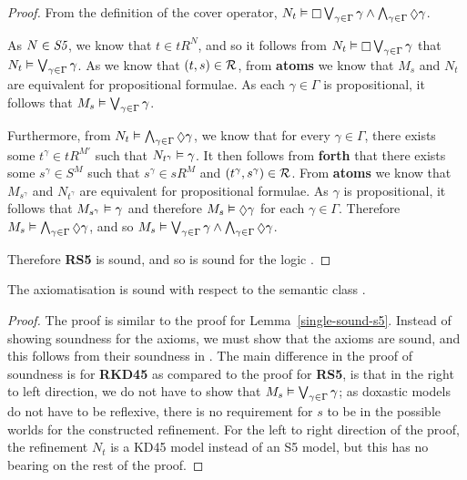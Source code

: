 \begin{proof}
From the definition of the cover operator, $N_t \entails \knows
\bigvee_{\gamma \in \Gamma} \gamma \land \bigwedge_{\gamma \in \Gamma} \suspects
\gamma$. 

As $N \in \textit{S5}$, we know that $t \in tR^N$, and so it follows from
$N_t \entails \knows \bigvee_{\gamma \in \Gamma} \gamma$ that $N_t
\vDash \bigvee_{\gamma \in \Gamma} \gamma$. As we know that $(t, s) \in {\cal
R}$, from {\bf atoms} we know that $M_s$ and $N_t$ are equivalent for
propositional formulae. As each $\gamma \in \Gamma$ is propositional, it follows
that $M_s \vDash \bigvee_{\gamma \in \Gamma} \gamma$.

Furthermore, from $N_t \entails \bigwedge_{\gamma \in \Gamma} \suspects
\gamma$, we know that for every $\gamma \in \Gamma$, there exists some
$t^\gamma \in tR^{M'}$ such that $N_{t^\gamma} \vDash \gamma$. It then
follows from {\bf forth} that there exists some $s^\gamma \in S^M$ such that
$s^\gamma \in sR^M$ and $(t^\gamma, s^\gamma) \in {\cal R}$. From {\bf atoms}
we know that $M_{s^\gamma}$ and $N_{t^\gamma}$ are equivalent for
propositional formulae. As $\gamma$ is propositional, it follows that
$M_{s^\gamma} \vDash \gamma$ and therefore $M_s \entails \suspects \gamma$ for
each $\gamma \in \Gamma$.  Therefore $M_s \entails \bigwedge_{\gamma \in \Gamma}
\suspects \gamma$, and so $M_s \entails \bigvee_{\gamma \in \Gamma} \gamma \land
\bigwedge_{\gamma \in \Gamma} \suspects \gamma$.

Therefore {\bf RS5} is sound, and so \axiomSiF{} is sound for the logic
\logicSiF{}.
\end{proof}

\begin{lemma}\label{single-sound-kd45}
The axiomatisation \axiomKDiF{} is sound with respect to the semantic class
\classKDi{}.
\end{lemma}

\begin{proof}
The proof is similar to the proof for Lemma~\ref{single-sound-s5}. Instead of
showing soundness for the \axiomSi{} axioms, we must show that the \axiomKDi{}
axioms are sound, and this follows from their soundness in \logicKDi{}. The main
difference in the proof of soundness is for {\bf RKD45} as compared to the proof
for {\bf RS5}, is that in the right to left direction, we do not have to show
that $M_s \vDash \bigvee_{\gamma \in \Gamma} \gamma$; as doxastic models do
not have to be reflexive, there is no requirement for $s$ to be in the possible
worlds for the constructed refinement. For the left to right direction of the
proof, the refinement $N_t$ is a KD45 model instead of an S5 model, but this has
no bearing on the rest of the proof.
\end{proof}

